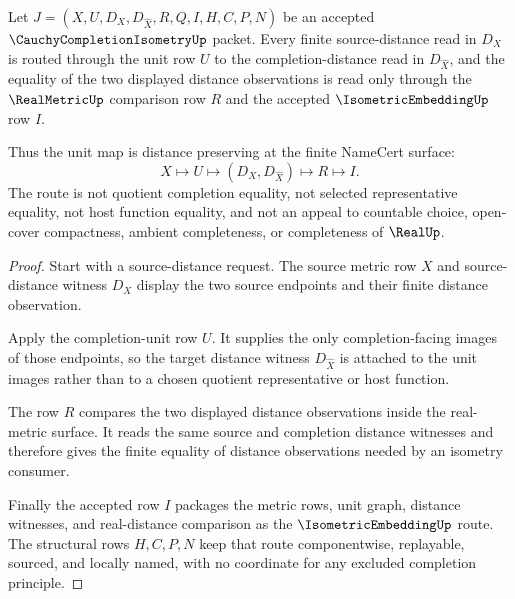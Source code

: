 \begin{theorem}
\label{thm:cauchy-completion-isometry-unit-distance-preservation}
Let $J=(X,U,D_X,D_{\widehat X},R,Q,I,H,C,P,N)$ be an accepted $\CauchyCompletionIsometryUp$ packet. Every finite source-distance read in $D_X$ is routed through the unit row $U$ to the completion-distance read in $D_{\widehat X}$, and the equality of the two displayed distance observations is read only through the $\RealMetricUp$ comparison row $R$ and the accepted $\IsometricEmbeddingUp$ row $I$.

Thus the unit map is distance preserving at the finite NameCert surface:
$$
X\longmapsto U\longmapsto (D_X,D_{\widehat X})\longmapsto R\longmapsto I .
$$
The route is not quotient completion equality, not selected representative equality, not host function equality, and not an appeal to countable choice, open-cover compactness, ambient completeness, or completeness of $\RealUp$.
\end{theorem}
\begin{proof}
Start with a source-distance request. The source metric row $X$ and source-distance witness $D_X$ display the two source endpoints and their finite distance observation.

Apply the completion-unit row $U$. It supplies the only completion-facing images of those endpoints, so the target distance witness $D_{\widehat X}$ is attached to the unit images rather than to a chosen quotient representative or host function.

The row $R$ compares the two displayed distance observations inside the real-metric surface. It reads the same source and completion distance witnesses and therefore gives the finite equality of distance observations needed by an isometry consumer.

Finally the accepted row $I$ packages the metric rows, unit graph, distance witnesses, and real-distance comparison as the $\IsometricEmbeddingUp$ route. The structural rows $H,C,P,N$ keep that route componentwise, replayable, sourced, and locally named, with no coordinate for any excluded completion principle.
\end{proof}

